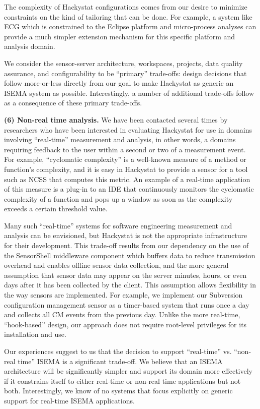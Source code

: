 \documentclass[10pt,twocolumn]{article}
\begin{document}
The complexity of Hackystat configurations comes from our desire to
minimize constraints on the kind of tailoring that can be done.  For
example, a system like ECG which is constrained to the Eclipse platform and
micro-process analyses can provide a much simpler extension mechanism for
this specific platform and analysis domain.


We consider the sensor-server architecture, workspaces, projects, data
quality assurance, and configurability to be ``primary'' trade-offs: design
decisions that follow more-or-less directly from our goal to make Hackystat
as generic an ISEMA system as possible.  Interestingly, a number of
additional trade-offs follow as a consequence of these primary trade-offs.

{\bf (6) Non-real time analysis.}  We have been contacted several times by
researchers who have been interested in evaluating Hackystat for use in
domains involving ``real-time'' measurement and analysis, in other words, a
domains requiring feedback to the user within a second or two of a
measurement event.  For example, ``cyclomatic complexity'' is a well-known
measure of a method or function's complexity, and it is easy in Hackystat
to provide a sensor for a tool such as NCSS that computes this metric.  An
example of a real-time application of this measure is a plug-in to an
IDE that continuously monitors the cyclomatic complexity of a function and
pops up a window as soon as the complexity exceeds a certain threshold
value.

Many such ``real-time'' systems for software engineering measurement and
analysis can be envisioned, but Hackystat is not the appropriate
infrastructure for their development.  This trade-off results from our
dependency on the use of the SensorShell middleware component which buffers
data to reduce transmission overhead and enables offline sensor data
collection, and the more general assumption that sensor data may appear on
the server minutes, hours, or even days after it has been collected by the
client. This assumption allows flexibility in the way sensors are
implemented.  For example, we implement our Subversion configuration
management sensor as a timer-based system that runs once a day and collects
all CM events from the previous day.  Unlike the more real-time,
``hook-based'' design, our approach does not require root-level privileges
for its installation and use. 

Our experiences suggest to us that the decision to support ``real-time''
vs.  ``non-real time'' ISEMA is a significant trade-off.  We believe that an
ISEMA architecture will be significantly simpler and support its domain
more effectively if it constrains itself to either real-time or non-real
time applications but not both.  Interestingly, we know of no systems that
focus explicitly on generic support for real-time ISEMA applications.
\end{document}
